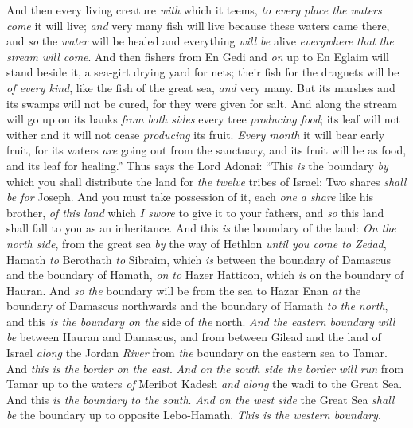 \begin{biblechapter}
\verse And then every living creature \textit{with} which it teems, \textit{to every place the waters come} it will live; \textit{and} very many fish will live because these waters came there, and \textit{so} the \textit{water} will be healed and everything \textit{will be} alive \textit{everywhere that} \textit{the stream will come}.
\verse And then fishers from En Gedi and \textit{on} up to En Eglaim will stand beside it, a sea-girt drying yard for nets; their fish for the dragnets will be \textit{of every kind}, like the fish of the great sea, \textit{and} very many.
\verse But its marshes and its swamps will not be cured, for they were given for salt.
\verse And along the stream will go up on its banks \textit{from both sides} every tree \textit{producing food}; its leaf will not wither and it will not cease \textit{producing} its fruit. \textit{Every month} it will bear early fruit, for its waters \textit{are} going out from the sanctuary, and its fruit will be as food, and its leaf for healing.”
\verse Thus says the Lord Adonai: “This \textit{is} the boundary \textit{by} which you shall distribute the land for \textit{the twelve} tribes of Israel: Two shares \textit{shall be for} Joseph.
\verse And you must take possession of it, each \textit{one} \textit{a share} like his brother, \textit{of this land} which \textit{I swore} to give it to your fathers, and \textit{so} this land shall fall to you as an inheritance.
\verse And this \textit{is} the boundary of the land: \textit{On the north side}, from the great sea \textit{by} the way of Hethlon \textit{until you come to Zedad},
\verse Hamath \textit{to} Berothath \textit{to} Sibraim, which \textit{is} between the boundary of Damascus and the boundary of Hamath, \textit{on to} Hazer Hatticon, which \textit{is} on the boundary of Hauran.
\verse And \textit{so} \textit{the} boundary will be from the sea to Hazar Enan \textit{at} the boundary of Damascus northwards and the boundary of Hamath \textit{to the north}, and this \textit{is the boundary on the} side of \textit{the} north.
\verse \textit{And the eastern boundary} \textit{will be} between Hauran and Damascus, and from between Gilead and the land of Israel \textit{along} the Jordan \textit{River} from \textit{the} boundary on the eastern sea to Tamar. And \textit{this is the border on the east}.
\verse \textit{And on the south side the border} \textit{will run} from Tamar up to the waters \textit{of} Meribot Kadesh \textit{and along} the wadi to the Great Sea. And this \textit{is} \textit{the boundary to the south}.
\verse \textit{And on the west side} the Great Sea \textit{shall be} the boundary up to opposite Lebo-Hamath. \textit{This is the western boundary}.

\end{biblechapter}
